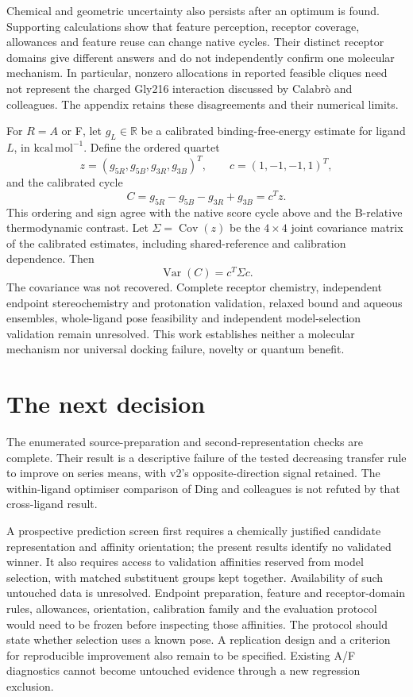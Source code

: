 \documentclass{article}
\begin{document}
Chemical and geometric uncertainty also persists after an optimum is found. Supporting calculations show that feature perception, receptor coverage, allowances and feature reuse can change native cycles. Their distinct receptor domains give different answers and do not independently confirm one molecular mechanism. In particular, nonzero allocations in reported feasible cliques need not represent the charged Gly216 interaction discussed by Calabr\`o and colleagues. The appendix retains these disagreements and their numerical limits.

For \(R=A\) or F, let \(g_L\in\mathbb R\) be a calibrated binding-free-energy estimate for ligand \(L\), in \(\mathrm{kcal\,mol^{-1}}\). Define the ordered quartet
\[
 z=(g_{5R},g_{5B},g_{3R},g_{3B})^T,
 \qquad c=(1,-1,-1,1)^T,
\]
and the calibrated cycle
\[
 C=g_{5R}-g_{5B}-g_{3R}+g_{3B}=c^Tz.
\]
This ordering and sign agree with the native score cycle above and the B-relative thermodynamic contrast. Let \(\Sigma=\operatorname{Cov}(z)\) be the \(4\times4\) joint covariance matrix of the calibrated estimates, including shared-reference and calibration dependence. Then
\[
 \operatorname{Var}(C)=c^T\Sigma c.
\]
The covariance was not recovered. Complete receptor chemistry, independent endpoint stereochemistry and protonation validation, relaxed bound and aqueous ensembles, whole-ligand pose feasibility and independent model-selection validation remain unresolved. This work establishes neither a molecular mechanism nor universal docking failure, novelty or quantum benefit.

\section{The next decision}

The enumerated source-preparation and second-representation checks are complete. Their result is a descriptive failure of the tested decreasing transfer rule to improve on series means, with v2's opposite-direction signal retained. The within-ligand optimiser comparison of Ding and colleagues is not refuted by that cross-ligand result.

A prospective prediction screen first requires a chemically justified candidate representation and affinity orientation; the present results identify no validated winner. It also requires access to validation affinities reserved from model selection, with matched substituent groups kept together. Availability of such untouched data is unresolved. Endpoint preparation, feature and receptor-domain rules, allowances, orientation, calibration family and the evaluation protocol would need to be frozen before inspecting those affinities. The protocol should state whether selection uses a known pose. A replication design and a criterion for reproducible improvement also remain to be specified. Existing A/F diagnostics cannot become untouched evidence through a new regression exclusion.
\end{document}
